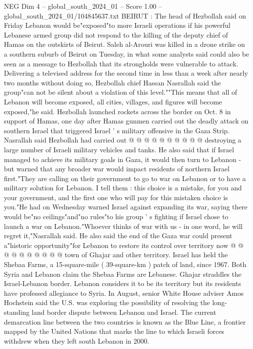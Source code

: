 \begin{textsample}{NEG Dim 4 – global\_south\_2024\_01 – Score 1.00 – global\_south\_2024\_01/104845637.txt}  \label{ex:f4_neg_088}
BEIRUT : The head of Hezbollah said on Friday Lebanon would be"exposed"to more Israeli operations if his powerful Lebanese armed group did not respond to the killing of the deputy chief of Hamas on the outskirts of Beirut.
Saleh al-Arouri was killed in a drone strike on a southern suburb of Beirut on Tuesday, in what some analysts said could also be seen as a message to Hezbollah that its strongholds were vulnerable to attack.
Delivering a televised address for the second time in less than a week after nearly two months without doing so, Hezbollah chief Hassan Nasrallah said the group"can not be silent about a violation of this level.""This means that all of Lebanon will become exposed, all cities, villages, and figures will become exposed,"he said.
Hezbollah launched rockets across the border on Oct. 8 in support of Hamas, one day after Hamas gunmen carried out the deadly attack on southern Israel that triggered Israel ' s military offensive in the Gaza Strip.
Nasrallah said Hezbollah had carried out @ @ @ @ @ @ @ @ @ @ destroying a large number of Israeli military vehicles and tanks.
He also said that if Israel managed to achieve its military goals in Gaza, it would then turn to Lebanon - but warned that any broader war would impact residents of northern Israel first."They are calling on their government to go to war on Lebanon or to have a military solution for Lebanon.
I tell them : this choice is a mistake, for you and your government, and the first one who will pay for this mistaken choice is you."He had on Wednesday warned Israel against expanding its war, saying there would be"no ceilings"and"no rules"to his group ' s fighting if Israel chose to launch a war on Lebanon."Whoever thinks of war with us - in one word, he will regret it,"Nasrallah said.
He also said the end of the Gaza war could present a"historic opportunity"for Lebanon to restore its control over territory now @ @ @ @ @ @ @ @ @ @ town of Ghajar and other territory.
Israel has held the Shebaa Farms, a 15-square-mile ( 39-square-km ) patch of land, since 1967.
Both Syria and Lebanon claim the Shebaa Farms are Lebanese.
Ghajar straddles the Israel-Lebanon border.
Lebanon considers it to be its territory but its residents have professed allegiance to Syria.
In August, senior White House adviser Amos Hochstein said the U.S. was exploring the possibility of resolving the long-standing land border dispute between Lebanon and Israel.
The current demarcation line between the two countries is known as the Blue Line, a frontier mapped by the United Nations that marks the line to which Israeli forces withdrew when they left south Lebanon in 2000.

\end{textsample}
